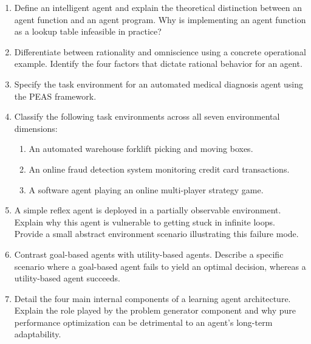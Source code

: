 \documentclass[12pt]{report}
\begin{document}
\begin{enumerate}
    \item Define an intelligent agent and explain the theoretical distinction between an agent function and an agent program. Why is implementing an agent function as a lookup table infeasible in practice?
    \item Differentiate between rationality and omniscience using a concrete operational example. Identify the four factors that dictate rational behavior for an agent.
    \item Specify the task environment for an automated medical diagnosis agent using the PEAS framework.
    \item Classify the following task environments across all seven environmental dimensions:
    \begin{enumerate}
        \item An automated warehouse forklift picking and moving boxes.
        \item An online fraud detection system monitoring credit card transactions.
        \item A software agent playing an online multi-player strategy game.
    \end{enumerate}
    \item A simple reflex agent is deployed in a partially observable environment. Explain why this agent is vulnerable to getting stuck in infinite loops. Provide a small abstract environment scenario illustrating this failure mode.
    \item Contrast goal-based agents with utility-based agents. Describe a specific scenario where a goal-based agent fails to yield an optimal decision, whereas a utility-based agent succeeds.
    \item Detail the four main internal components of a learning agent architecture. Explain the role played by the problem generator component and why pure performance optimization can be detrimental to an agent's long-term adaptability.
\end{enumerate}
\end{document}
